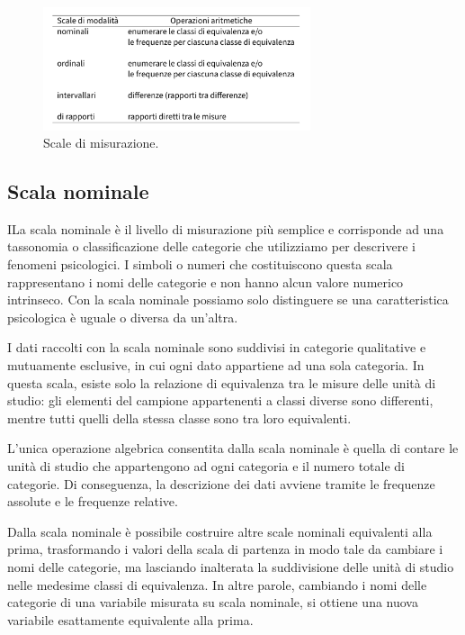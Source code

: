 \documentclass[
  letterpaper,
  DIV=11,
  numbers=noendperiod]{scrreprt}
\theoremstyle{definition}
\theoremstyle{remark}
\begin{document}
\begin{figure}[H]

{\centering \includegraphics[width=0.7\textwidth,height=\textheight]{chapters/key_notions/../../figures/misurazione_2.png}

}

\caption{Scale di misurazione.}

\end{figure}%

\subsection{Scala nominale}\label{scala-nominale}

ILa scala nominale è il livello di misurazione più semplice e
corrisponde ad una tassonomia o classificazione delle categorie che
utilizziamo per descrivere i fenomeni psicologici. I simboli o numeri
che costituiscono questa scala rappresentano i nomi delle categorie e
non hanno alcun valore numerico intrinseco. Con la scala nominale
possiamo solo distinguere se una caratteristica psicologica è uguale o
diversa da un'altra.

I dati raccolti con la scala nominale sono suddivisi in categorie
qualitative e mutuamente esclusive, in cui ogni dato appartiene ad una
sola categoria. In questa scala, esiste solo la relazione di equivalenza
tra le misure delle unità di studio: gli elementi del campione
appartenenti a classi diverse sono differenti, mentre tutti quelli della
stessa classe sono tra loro equivalenti.

L'unica operazione algebrica consentita dalla scala nominale è quella di
contare le unità di studio che appartengono ad ogni categoria e il
numero totale di categorie. Di conseguenza, la descrizione dei dati
avviene tramite le frequenze assolute e le frequenze relative.

Dalla scala nominale è possibile costruire altre scale nominali
equivalenti alla prima, trasformando i valori della scala di partenza in
modo tale da cambiare i nomi delle categorie, ma lasciando inalterata la
suddivisione delle unità di studio nelle medesime classi di equivalenza.
In altre parole, cambiando i nomi delle categorie di una variabile
misurata su scala nominale, si ottiene una nuova variabile esattamente
equivalente alla prima.
\end{document}
